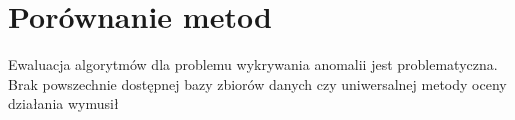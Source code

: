 \section{Porównanie metod}
Ewaluacja algorytmów dla problemu wykrywania anomalii jest problematyczna. Brak powszechnie dostępnej bazy zbiorów danych czy uniwersalnej metody oceny działania wymusił 